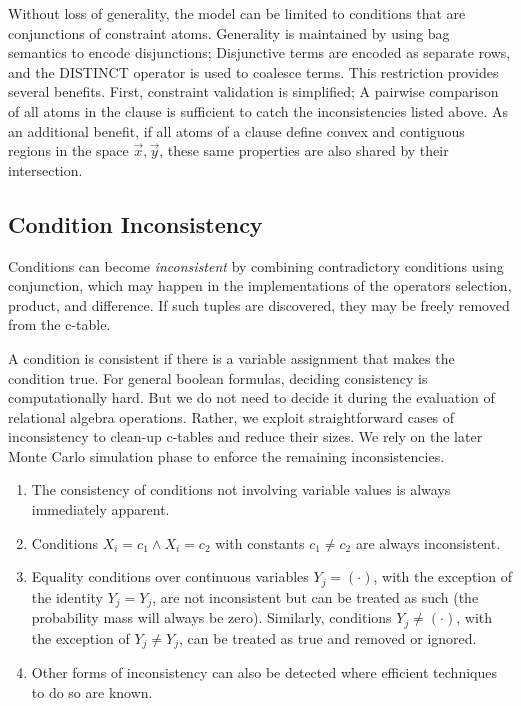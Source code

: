 Without loss of generality, the model can be limited to conditions that are conjunctions of constraint  atoms.  Generality  is maintained by  using bag semantics to encode disjunctions; Disjunctive terms are encoded as separate rows, and the DISTINCT operator is used to coalesce terms.  This  restriction   provides   several  benefits. First, constraint  validation is  simplified;  A pairwise  comparison of  all atoms in the clause is  sufficient to catch the inconsistencies listed above.   As an additional  benefit, if  all atoms  of a  clause define convex and  contiguous regions in the space $\vec{x},\vec{y}$, these same properties are also shared by their intersection.

\subsection{Condition Inconsistency}
Conditions can become \textit{inconsistent} by combining contradictory conditions using conjunction, which may happen in the implementations of the operators selection, product, and difference.  If such tuples are discovered, they may be freely removed from the c-table.  

A condition is consistent if there is a variable assignment that makes the condition true. For general boolean formulas, deciding consistency is computationally hard. But we do not need to decide it during the evaluation of relational algebra operations.  Rather, we exploit straightforward cases of inconsistency to clean-up c-tables and reduce their sizes. We rely on the later Monte Carlo simulation phase to enforce the remaining inconsistencies.
%
\begin{enumerate}
\item The consistency of conditions not involving variable values is always immediately apparent.
\item Conditions $X_i = c_1 \land X_i = c_2$ with constants $c_1 \neq c_2$ are always inconsistent.
\item Equality conditions over continuous variables $Y_j = (\cdot)$, with the exception of the identity $Y_j = Y_j$, are not inconsistent but can be treated as such (the probability mass will always be zero).  Similarly, conditions $Y_j \neq (\cdot)$, with the exception of $Y_j \neq Y_j$, can be treated as true and removed or ignored.
\item Other forms of inconsistency can also be detected where efficient techniques to do so are known.
\end{enumerate}


